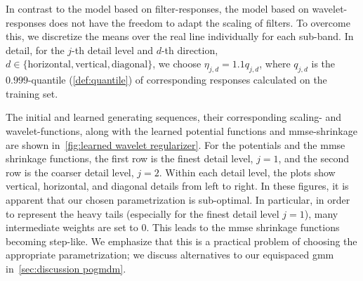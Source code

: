 In contrast to the model based on filter-responses, the model based on wavelet-responses does not have the freedom to adapt the scaling of filters.
To overcome this, we discretize the means over the real line individually for each sub-band.
In detail, for the \( j \)-th detail level and \( d \)-th direction, \( d \in \{ \text{horizontal}, \text{vertical}, \text{diagonal} \} \), we choose \( \eta_{j, d} = \num{1.1} q_{j, d} \), where \( q_{j, d} \) is the \( \num{0.999} \)-quantile (\cref{def:quantile}) of corresponding responses calculated on the training set.

The initial and learned generating sequences, their corresponding scaling- and wavelet-functions, along with the learned potential functions and \gls{mmse}-shrinkage are shown in~\cref{fig:learned wavelet regularizer}.
For the potentials and the \gls{mmse} shrinkage functions, the first row is the finest detail level, \( j = \num{1} \), and the second row is the coarser detail level, \( j = \num{2} \).
Within each detail level, the plots show vertical, horizontal, and diagonal details from left to right.
In these figures, it is apparent that our chosen parametrization is sub-optimal.
In particular, in order to represent the heavy tails (especially for the finest detail level \( j = \num{1} \)), many intermediate weights are set to \( \num{0} \).
This leads to the \gls{mmse} shrinkage functions becoming step-like.
We emphasize that this is a practical problem of choosing the appropriate parametrization; we discuss alternatives to our equispaced \gls{gmm} in~\cref{sec:discussion pogmdm}.
